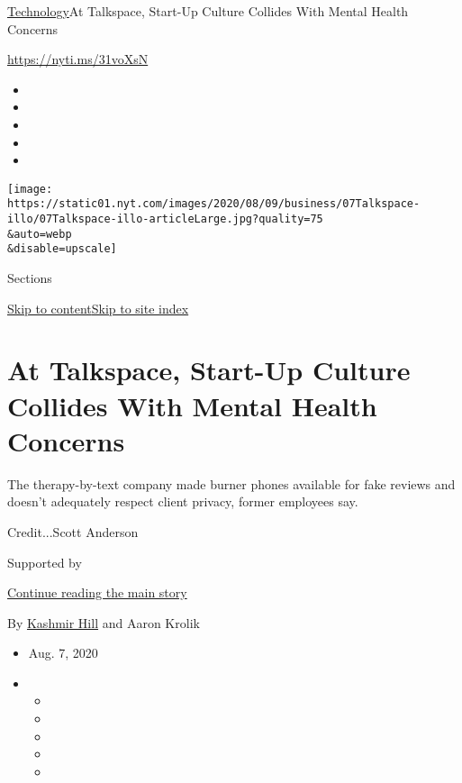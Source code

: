 \href{/section/technology}{Technology}\textbar{}At Talkspace, Start-Up
Culture Collides With Mental Health Concerns

\href{https://nyti.ms/31voXsN}{https://nyti.ms/31voXsN}

\begin{itemize}
\item
\item
\item
\item
\item
\end{itemize}

\texttt{[image: https://static01.nyt.com/images/2020/08/09/business/07Talkspace-illo/07Talkspace-illo-articleLarge.jpg?quality=75\\\&auto=webp\\\&disable=upscale]}

Sections

\protect\hyperlink{site-content}{Skip to
content}\protect\hyperlink{site-index}{Skip to site index}

\hypertarget{at-talkspace-start-up-culture-collides-with-mental-health-concerns}{%
\section{At Talkspace, Start-Up Culture Collides With Mental Health
Concerns}\label{at-talkspace-start-up-culture-collides-with-mental-health-concerns}}

The therapy-by-text company made burner phones available for fake
reviews and doesn't adequately respect client privacy, former employees
say.

Credit...Scott Anderson

Supported by

\protect\hyperlink{after-sponsor}{Continue reading the main story}

By \href{https://www.nytimes.com/by/kashmir-hill}{Kashmir Hill} and
Aaron Krolik

\begin{itemize}
\item
  Aug. 7, 2020
\item
  \begin{itemize}
  \item
  \item
  \item
  \item
  \item
  \end{itemize}
\end{itemize}


